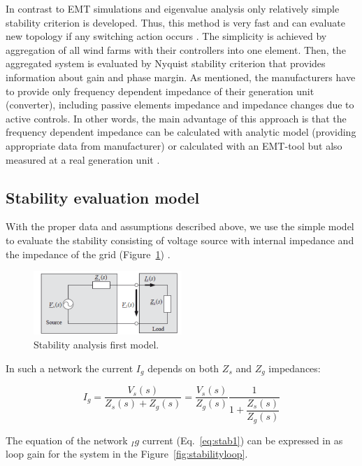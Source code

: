 \documentclass[12pt]{report} %
\begin{document}
In contrast to EMT simulations and eigenvalue analysis only relatively simple stability criterion is developed. Thus, this method is very fast and can evaluate new topology if any switching action occurs \cite{borwin1}. The simplicity is achieved by aggregation of all wind farms with their controllers into one element. Then, the aggregated system is evaluated by Nyquist stability criterion that provides information about gain and phase margin. As mentioned, the manufacturers have to provide only frequency dependent impedance of their generation unit (converter), including passive elements impedance and impedance changes due to active controls. In other words, the main advantage of this approach is that the frequency dependent impedance can be calculated with analytic model (providing appropriate data from manufacturer) or calculated with an EMT-tool but also measured at a real generation unit \cite{borwin1}.

\subsection{Stability evaluation model} \label{sec:stabilitymodel}
With the proper data and assumptions described above, we use the simple model to evaluate the stability consisting of voltage source with internal impedance and the impedance of the grid (Figure~\ref{fig:stabilitymodel1}) \cite{sun2011, borwin1}.

\begin{figure}[htb]
	\centering
    	\includegraphics[width=0.5\textwidth]{img/theory/stability_model1.png}
  	\caption{Stability analysis first model.}
  	\label{fig:stabilitymodel1}
\end{figure}
\FloatBarrier

In such a network the current $I_g$ depends on both $Z_s$ and $Z_g$ impedances:

\begin{equation} \label{eq:stab1}
	I_g=\dfrac{V_s (s)}{Z_s (s)+Z_g (s)}=\dfrac{V_s (s)}{Z_g (s)} \dfrac{1}{1+\dfrac{Z_s (s)}{Z_g (s)}}
\end{equation}

The equation of the network $_Ig$ current (Eq.~\ref{eq:stab1}) can be expressed in as loop gain for the system in the Figure~\ref{fig:stabilityloop}.
\end{document}
